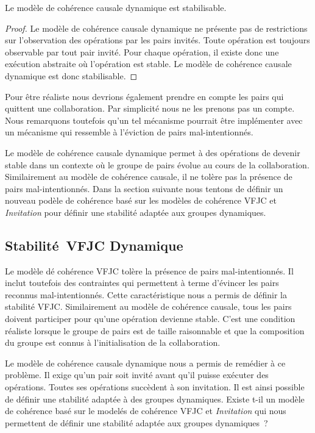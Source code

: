 \begin{theorem}\label{th:stabilizable-dyn-causal}
Le modèle de cohérence causale dynamique est stabilisable.
\end{theorem}

\begin{proof}
Le modèle de cohérence causale dynamique ne présente pas de restrictions sur l'observation des opérations par les pairs invités.
Toute opération est toujours observable par tout pair invité.
Pour chaque opération, il existe donc une exécution abstraite où l'opération est stable.
Le modèle de cohérence causale dynamique est donc stabilisable.
\end{proof}

Pour être réaliste nous devrions également prendre en compte les pairs qui quittent une collaboration.
Par simplicité nous ne les prenons pas un compte.
Nous remarquons toutefois qu'un tel mécanisme pourrait être implémenter avec un mécanisme qui ressemble à l'éviction de pairs mal-intentionnés.

Le modèle de cohérence causale dynamique permet à des opérations de devenir stable dans un contexte où le groupe de pairs évolue au cours de la collaboration.
Similairement au modèle de cohérence causale, il ne tolère pas la présence de pairs mal-intentionnés.
Dans la section suivante nous tentons de définir un nouveau podèle de cohérence basé sur les modèles de cohérence \acs{VFJC} et \emph{Invitation} pour définir une stabilité adaptée aux groupes dynamiques.


\subsection{Stabilité~\acl{VFJC} Dynamique}\label{subsec:dvfjcs}

Le modèle dé cohérence \ac{VFJC} tolère la présence de pairs mal-intentionnés.
Il inclut toutefois des contraintes qui permettent à terme d'évincer les pairs reconnus mal-intentionnés.
Cette caractéristique nous a permis de définir la stabilité \ac{VFJC}.
Similairement au modèle de cohérence causale, tous les pairs doivent participer pour qu'une opération devienne stable.
C'est une condition réaliste lorsque le groupe de pairs est de taille raisonnable et que la composition du groupe est connus à l'initialisation de la collaboration.

Le modèle de cohérence causale dynamique nous a permis de remédier à ce problème.
Il exige qu'un pair soit invité avant qu'il puisse exécuter des opérations.
Toutes ses opérations succèdent à son invitation.
Il est ainsi possible de définir une stabilité adaptée à des groupes dynamiques.
Existe t-il un modèle de cohérence basé sur le modelés de cohérence \acs{VFJC} et \emph{Invitation} qui nous permettent de définir une stabilité adaptée aux groupes dynamiques~?

